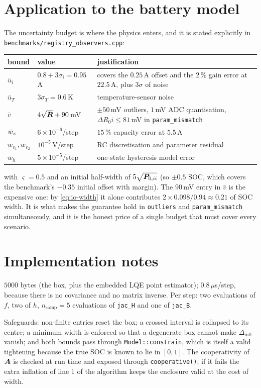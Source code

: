 \section{Application to the battery model}
The uncertainty budget is where the physics enters, and it is stated explicitly in
\texttt{benchmarks/registry\_observers.cpp}:
\begin{center}
\begin{tabular}{@{}ll>{\raggedright\arraybackslash}p{}@{}}
\toprule
bound & value & justification \\
\midrule
$\bar{u}_{i}$ & $0.8 + 3\sigma_i = 0.95$\,A & covers the $0.25$\,A offset and the $2\,\%$ gain error at $22.5$\,A, plus $3\sigma$ of noise \\
$\bar{u}_{T}$ & $3\sigma_T = 0.6$\,K & temperature-sensor noise \\
$\bar{v}$ & $4\sqrt{\bm{R}} + 90$\,mV & $\pm50$\,mV outliers, $1$\,mV ADC quantisation, $\Delta R_0 i \le 81$\,mV in \texttt{param\_mismatch} \\
$\bar{w}_{z}$ & $6\times10^{-6}$/step & $15\,\%$ capacity error at $5.5$\,A \\
$\bar{w}_{v_1},\bar{w}_{v_2}$ & $10^{-5}$\,V/step & RC discretisation and parameter residual \\
$\bar{w}_h$ & $5\times10^{-5}$/step & one-state hysteresis model error \\
\bottomrule
\end{tabular}
\end{center}
with $\varsigma = 0.5$ and an initial half-width of $5\sqrt{\bm{P}_{0,ii}}$ (so $\pm0.5$ SOC, which
covers the benchmark's $-0.35$ initial offset with margin).  The $90$\,mV entry in $\bar{v}$ is
the expensive one: by \eqref{eq:io-width} it alone contributes $2\times0.098/0.94 \approx 0.21$ of
SOC width.  It is what makes the guarantee hold in \texttt{outliers} and \texttt{param\_mismatch}
simultaneously, and it is the honest price of a single budget that must cover every scenario.

\section{Implementation notes}
$5000$ bytes (the box, plus the embedded LQE point estimator); $0.8\,\mu$s/step, because
there is no covariance and no matrix inverse.  Per step: two evaluations of $f$, two of $h$,
$n_{\mathrm{samp}}=5$ evaluations of \texttt{jac\_H} and one of \texttt{jac\_B}.

Safeguards: non-finite entries reset the box; a crossed interval is collapsed to its centre; a
minimum width is enforced so that a degenerate box cannot make $\Delta_{\mathrm{infl}}$ vanish;
and both bounds pass through \texttt{Model::constrain}, which is itself a valid tightening because
the true SOC is known to lie in $[0,1]$.  The cooperativity of $\bm{A}$ is checked at run time and
exposed through \texttt{cooperative()}; if it fails the extra inflation of line 1 of the algorithm
keeps the enclosure valid at the cost of width.

